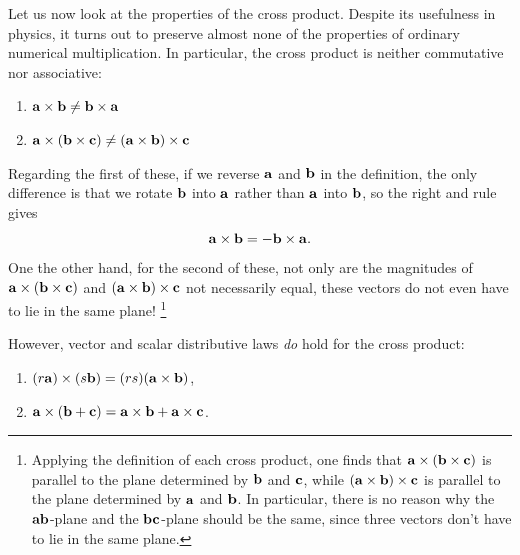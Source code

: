 \documentclass[12pt,letterpaper,reqno]{article}
\numberwithin{equation}{section}
\newcommand{\ti}[1]{\textit{#1}}
\begin{document}
Let us now look at the properties of the cross product. Despite its usefulness in physics, it turns out to preserve almost none of the properties of ordinary numerical multiplication. In particular, the cross product is neither commutative nor associative:


\begin{enumerate}[(1)]
	\item ${\bf a} \times {\bf b} \neq {\bf b}  \times {\bf a}$
	\item ${\bf a} \times ({\bf b} \times {\bf c}) \neq ({\bf a} \times {\bf b}) \times {\bf c}$
\end{enumerate}	

Regarding the first of these, if we reverse ${\bf a}$ and ${\bf b}$ in the definition, the only difference is that we rotate ${\bf b}$ into ${\bf a}$ rather than ${\bf a}$ into ${\bf b}$, so the right and rule gives
\begin{equation}
	{\bf a} \times {\bf b}=-{\bf b} \times {\bf a}.
\end{equation}
One the other hand, for the second of these, not only are the magnitudes of ${\bf a} \times ({\bf b} \times {\bf c})$ and $({\bf a} \times {\bf b}) \times {\bf c}$ not necessarily equal, these vectors do not even have to lie in the same plane! \footnote{Applying the definition of each cross product, one finds that ${\bf a} \times ({\bf b} \times {\bf c})$ is parallel to the plane determined by ${\bf b}$ and ${\bf c}$, while $({\bf a} \times {\bf b}) \times {\bf c}$ is parallel to the plane determined by ${\bf a}$ and ${\bf b}$. In particular, there is no reason why the ${\bf a}{\bf b}$-plane and the ${\bf b}{\bf c}$-plane should be the same, since three vectors don't have to lie in the same plane.}

However, vector and scalar distributive laws \ti{do} hold for the cross product:
\begin{prop}
	\begin{enumerate}[(1)]\hspace{10cm}
	\item $(r{\bf a}) \times (s{\bf b})=(rs)({\bf a} \times {\bf b})$,
	\item ${\bf a} \times ({\bf b} + {\bf c})={\bf a} \times {\bf b}+{\bf a} \times {\bf c}$.
\end{enumerate}
\end{prop}
\end{document}
